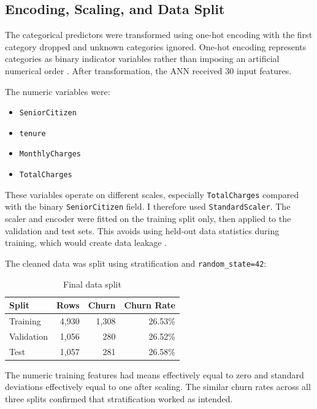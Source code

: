 \documentclass[11pt]{article}
\begin{document}
\subsection{Encoding, Scaling, and Data Split}

The categorical predictors were transformed using one-hot encoding with the first category dropped and unknown categories ignored. One-hot encoding represents categories as binary indicator variables rather than imposing an artificial numerical order \citep{sklearnOHE}. After transformation, the ANN received 30 input features.

The numeric variables were:

\begin{itemize}[leftmargin=*]
    \item \texttt{SeniorCitizen}
    \item \texttt{tenure}
    \item \texttt{MonthlyCharges}
    \item \texttt{TotalCharges}
\end{itemize}

These variables operate on different scales, especially \texttt{TotalCharges} compared with the binary \texttt{SeniorCitizen} field. I therefore used \texttt{StandardScaler}. The scaler and encoder were fitted on the training split only, then applied to the validation and test sets. This avoids using held-out data statistics during training, which would create data leakage \citep{sklearnScale}.

The cleaned data was split using stratification and \texttt{random\_state=42}:

\begin{table}[H]
\centering
\caption{Final data split}
\label{tab:splits}
\begin{tabular}{lrrr}
\toprule
\textbf{Split} & \textbf{Rows} & \textbf{Churn} & \textbf{Churn Rate}\\
\midrule
Training & 4,930 & 1,308 & 26.53\%\\
Validation & 1,056 & 280 & 26.52\%\\
Test & 1,057 & 281 & 26.58\%\\
\bottomrule
\end{tabular}
\end{table}

The numeric training features had means effectively equal to zero and standard deviations effectively equal to one after scaling. The similar churn rates across all three splits confirmed that stratification worked as intended.
\end{document}
